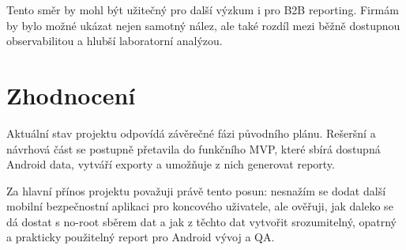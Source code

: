 \documentclass[11pt,a4paper]{article}
\begin{document}
Tento směr by mohl být užitečný pro další výzkum i pro B2B reporting. Firmám by bylo možné ukázat nejen samotný nález, ale také rozdíl mezi běžně dostupnou observabilitou a hlubší laboratorní analýzou.

\section{Zhodnocení}

Aktuální stav projektu odpovídá závěrečné fázi původního plánu. Rešeršní a návrhová část se postupně přetavila do funkčního MVP, které sbírá dostupná Android data, vytváří exporty a umožňuje z nich generovat reporty.

Za hlavní přínos projektu považuji právě tento posun: nesnažím se dodat další mobilní bezpečnostní aplikaci pro koncového uživatele, ale ověřuji, jak daleko se dá dostat s no-root sběrem dat a jak z těchto dat vytvořit srozumitelný, opatrný a prakticky použitelný report pro Android vývoj a QA.
\end{document}
